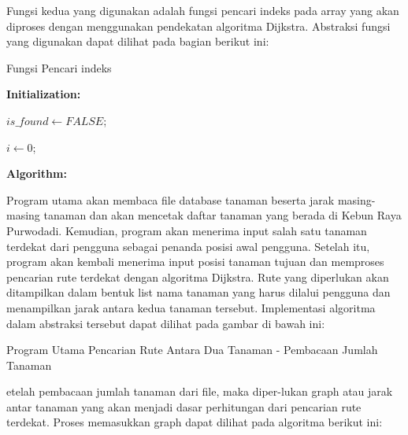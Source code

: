 \documentclass[conference]{IEEEtran}
\begin{document}
Fungsi kedua yang digunakan adalah fungsi pencari indeks
pada array yang akan diproses dengan menggunakan pendekatan algoritma Dijkstra. Abstraksi fungsi yang digunakan
dapat dilihat pada bagian berikut ini:

\begin{algorithm}
    \caption{Fungsi Pencari indeks}
    \textbf{Initialization:}
    
    $is\_found ← FALSE$;

    $i ← 0$;

    \textbf{Algorithm:}

\end{algorithm}

Program utama akan membaca file database tanaman
beserta jarak masing-masing tanaman dan akan mencetak
daftar tanaman yang berada di Kebun Raya Purwodadi.
Kemudian, program akan menerima input salah satu tanaman
terdekat dari pengguna sebagai penanda posisi awal pengguna.
Setelah itu, program akan kembali menerima input posisi
tanaman tujuan dan memproses pencarian rute terdekat dengan
algoritma Dijkstra. Rute yang diperlukan akan ditampilkan
dalam bentuk list nama tanaman yang harus dilalui pengguna
dan menampilkan jarak antara kedua tanaman tersebut.
Implementasi algoritma dalam abstraksi tersebut dapat dilihat
pada gambar di bawah ini:

\begin{algorithm}
    \caption{Program Utama Pencarian Rute Antara Dua Tanaman -
    Pembacaan Jumlah Tanaman}
\end{algorithm}

etelah pembacaan jumlah tanaman dari file, maka diper-lukan graph atau jarak antar tanaman yang akan menjadi dasar
perhitungan dari pencarian rute terdekat. Proses memasukkan
graph dapat dilihat pada algoritma berikut ini:
\end{document}
